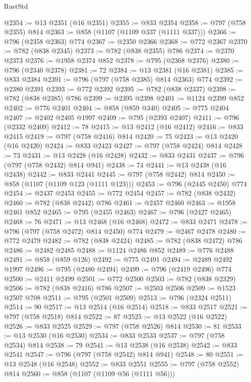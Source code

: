 \begin{lexlean}{RustStd}
\begin{coremodule}
@2354 := @13 @2351 (@16 @2351)
@2355 := @833 @2354
@2358 := @797 (@758 @2355) @814
@2363 := @858 (@1107 (@1109 @337 (@1111 @337)))
@2366 := @796 (@2358 @2363) @774
@2367 := @2350 @2366
@2368 := @772 @2367
@2370 := @782 (@838 @2345)
@2373 := @782 (@838 @2355) @786
@2374 := @2370 @2373
@2376 := @1958 @2374 @852
@2378 := @795 (@2368 @2376)
@2380 := @796 (@2340 @2378)
@2381 := 72
@2384 := @13 @2381 (@16 @2381)
@2385 := @833 @2384
@2391 := @796 (@797 (@758 @2385) @814 @2363) @774
@2392 := @2380 @2391
@2393 := @772 @2392
@2395 := @782 (@838 @2337)
@2398 := @782 (@838 @2385) @786
@2399 := @2395 @2398
@2401 := @1124 @2399 @852
@2402 := @776 @2401
@2404 := @858 (@859 @340)
@2405 := @775 @2404
@2407 := @2402 @2405 @1997
@2409 := @795 (@2393 @2407)
@2411 := @796 (@2332 @2409)
@2412 := 78
@2415 := @13 @2412 (@16 @2412)
@2416 := @833 @2415
@2419 := @797 (@758 @2416) @814
@2420 := 75
@2423 := @13 @2420 (@16 @2420)
@2424 := @833 @2423
@2427 := @797 (@758 @2424) @814
@2428 := 73
@2431 := @13 @2428 (@16 @2428)
@2432 := @833 @2431
@2437 := @796 (@797 (@758 @2432) @814 @941)
@2438 := 74
@2441 := @13 @2438 (@16 @2438)
@2442 := @833 @2441
@2445 := @797 (@758 @2442) @814
@2450 := @858 (@1107 (@1109 @123 (@1111 @123)))
@2453 := @796 (@2445 @2450) @774
@2454 := @2437 @2453
@2455 := @772 @2454
@2457 := @782 (@838 @2432)
@2460 := @782 (@838 @2442) @786
@2461 := @2457 @2460
@2463 := @1958 @2461 @852
@2465 := @795 (@2455 @2463)
@2467 := @796 (@2427 @2465)
@2468 := 76
@2471 := @13 @2468 (@16 @2468)
@2472 := @833 @2471
@2478 := @796 (@797 (@758 @2472) @814 @2450) @774
@2479 := @2467 @2478
@2480 := @772 @2479
@2482 := @782 (@838 @2424)
@2485 := @782 (@838 @2472) @786
@2486 := @2482 @2485
@2488 := @1124 @2486 @852
@2489 := @776 @2488
@2491 := @858 (@859 @126)
@2492 := @775 @2491
@2494 := @2489 @2492 @1997
@2496 := @795 (@2480 @2494)
@2499 := @796 (@2419 @2496) @774
@2500 := @2411 @2499
@2501 := @772 @2500
@2503 := @782 (@838 @2329)
@2506 := @782 (@838 @2416) @786
@2507 := @2503 @2506
@2509 := @1523 @2507 @708
@2511 := @795 (@2501 @2509)
@2513 := @796 (@2324 @2511)
@2514 := 90
@2517 := @13 @2514 (@16 @2514)
@2518 := @833 @2517
@2521 := @797 (@758 @2518) @814
@2522 := 87
@2525 := @13 @2522 (@16 @2522)
@2526 := @833 @2525
@2529 := @797 (@758 @2526) @814
@2530 := 81
@2533 := @13 @2530 (@16 @2530)
@2534 := @833 @2533
@2537 := @797 (@758 @2534) @814
@2538 := 79
@2541 := @13 @2538 (@16 @2538)
@2542 := @833 @2541
@2547 := @796 (@797 (@758 @2542) @814 @941)
@2548 := 80
@2551 := @13 @2548 (@16 @2548)
@2552 := @833 @2551
@2555 := @797 (@758 @2552) @814
@2560 := @858 (@1107 (@1109 @56 (@1111 @56)))

\end{coremodule}
\end{lexlean}
